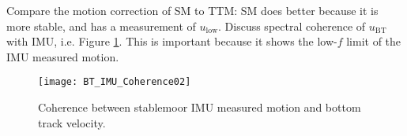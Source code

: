 Compare the motion correction of SM to TTM: SM does better because it is more stable, and has a measurement of $u_\mathrm{low}$. Discuss spectral coherence of $u_\mathrm{BT}$ with IMU, i.e. Figure \ref{fig:SM_coh}. This is important because it shows the low-$f$ limit of the IMU measured motion.

\begin{figure}[t]
  \centering
  \texttt{[image: BT\_IMU\_Coherence02]}
  \caption{Coherence between stablemoor IMU measured motion and bottom track velocity.}
  \label{fig:SM_coh}
\end{figure}
